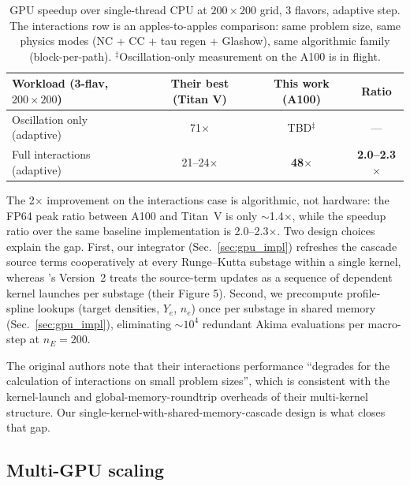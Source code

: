 \begin{table}[t]
\centering
\small
\begin{tabular}{l c c c}
\toprule
Workload (3-flav, $200\times200$) & Their best (Titan V) & This work (A100) & Ratio \\
\midrule
Oscillation only (adaptive) & 71$\times$ \cite{kallenborn2019} & TBD$^\ddagger$ & --- \\
Full interactions (adaptive) & 21--24$\times$ \cite{kallenborn2019} & \textbf{48$\times$} & \textbf{2.0--2.3$\times$} \\
\bottomrule
\end{tabular}
\caption{GPU speedup over single-thread CPU at $200\times200$ grid,
3 flavors, adaptive step. The interactions row is an apples-to-apples
comparison: same problem size, same physics modes (NC + CC + tau
regen + Glashow), same algorithmic family (block-per-path).
$^\ddagger$Oscillation-only measurement on the A100 is in flight.}
\label{tab:vs_kallenborn}
\end{table}

The 2$\times$ improvement on the interactions case is algorithmic,
not hardware: the FP64 peak ratio between A100 and Titan~V is only
$\sim$1.4$\times$, while the speedup ratio over the same baseline
implementation is 2.0--2.3$\times$. Two design choices explain the
gap. First, our integrator (Sec.~\ref{sec:gpu_impl}) refreshes the
cascade source terms cooperatively at every Runge--Kutta substage
within a single kernel, whereas \cite{kallenborn2019}'s Version~2
treats the source-term updates as a sequence of dependent kernel
launches per substage (their Figure 5). Second, we precompute
profile-spline lookups (target densities, $Y_e$, $n_e$) once per
substage in shared memory (Sec.~\ref{sec:gpu_impl}), eliminating
$\sim 10^4$ redundant Akima evaluations per macro-step at
$n_E = 200$.

The original \cite{kallenborn2019} authors note that their
interactions performance ``degrades for the calculation of
interactions on small problem sizes'', which is consistent with the
kernel-launch and global-memory-roundtrip overheads of their
multi-kernel structure. Our single-kernel-with-shared-memory-cascade
design is what closes that gap.

\subsection{Multi-GPU scaling}

